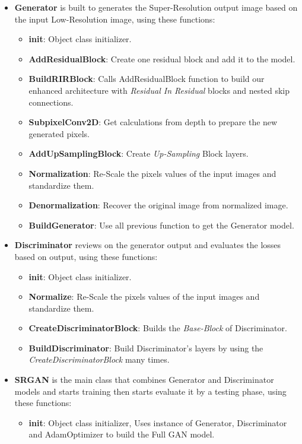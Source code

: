 \documentclass[12pt]{article}
\begin{document}
			\begin{itemize}
				\item \textbf{Generator} is built to generates the Super-Resolution output image based on the input Low-Resolution image, using these functions:
					\begin{itemize}
						\item \textbf{init}: Object class initializer.
						\item \textbf{AddResidualBlock}: Create one residual block and add it to the model.
						\item \textbf{BuildRIRBlock}: Calls AddResidualBlock function to build our enhanced architecture with \textit{Residual In Residual} blocks and nested skip connections.
						\item \textbf{SubpixelConv2D}: Get calculations from depth to prepare the new generated pixels.
						\item \textbf{AddUpSamplingBlock}: Create \textit{Up-Sampling} Block layers.
						\item \textbf{Normalization}: Re-Scale the pixels values of the input images and standardize them.
						\item \textbf{Denormalization}: Recover the original image from normalized image.
						\item \textbf{BuildGenerator}: Use all previous function to get the Generator model.
					\end{itemize}
				\item \textbf{Discriminator} reviews on the generator output and evaluates the losses based on output, using these functions:
					\begin{itemize}
						\item \textbf{init}: Object class initializer.
						\item \textbf{Normalize}: Re-Scale the pixels values of the input images and standardize them.
						\item \textbf{CreateDiscriminatorBlock}: Builds the \textit{Base-Block} of Discriminator.
						\item \textbf{BuildDiscriminator}: Build Discriminator's layers by using the \textit{CreateDiscriminatorBlock} many times.
					\end{itemize}
				\item \textbf{SRGAN} is the main class that combines Generator and Discriminator models and starts training then starts evaluate it by a testing phase, using these functions:
					\begin{itemize}
						\item \textbf{init}: Object class initializer, Uses instance of Generator, Discriminator and AdamOptimizer to build the Full GAN model.

\end{itemize}
\end{itemize}
\end{document}
